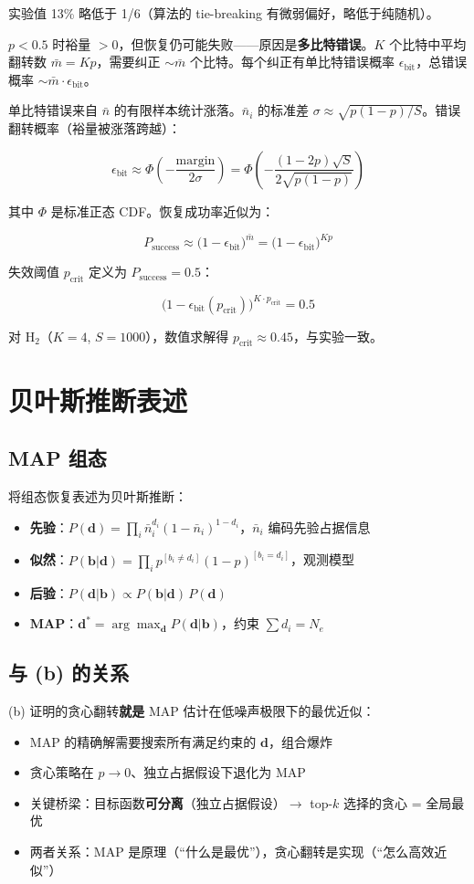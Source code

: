 \documentclass[11pt,a4paper]{article}
\begin{document}
实验值 13\% 略低于 1/6（算法的 tie-breaking 有微弱偏好，略低于纯随机）。

$p < 0.5$ 时裕量 $> 0$，但恢复仍可能失败——原因是\textbf{多比特错误}。$K$ 个比特中平均翻转数 $\bar{m} = Kp$，需要纠正 $\sim \bar{m}$ 个比特。每个纠正有单比特错误概率 $\epsilon_{\text{bit}}$，总错误概率 $\sim \bar{m} \cdot \epsilon_{\text{bit}}$。

单比特错误来自 $\bar{n}$ 的有限样本统计涨落。$\bar{n}_i$ 的标准差 $\sigma \approx \sqrt{p(1-p)/S}$。错误翻转概率（裕量被涨落跨越）：

$$\epsilon_{\text{bit}} \approx \Phi\!\left(-\frac{\text{margin}}{2\sigma}\right) = \Phi\!\left(-\frac{(1-2p)\sqrt{S}}{2\sqrt{p(1-p)}}\right)$$

其中 $\Phi$ 是标准正态 CDF。恢复成功率近似为：

$$P_{\text{success}} \approx \big(1 - \epsilon_{\text{bit}}\big)^{\bar{m}} = \big(1 - \epsilon_{\text{bit}}\big)^{Kp}$$

失效阈值 $p_{\text{crit}}$ 定义为 $P_{\text{success}} = 0.5$：

$$\big(1 - \epsilon_{\text{bit}}(p_{\text{crit}})\big)^{K \cdot p_{\text{crit}}} = 0.5$$

对 H$_2$（$K=4$, $S=1000$），数值求解得 $p_{\text{crit}} \approx 0.45$，与实验一致。


\section*{贝叶斯推断表述}

\subsection*{MAP 组态}

将组态恢复表述为贝叶斯推断：

\begin{itemize}
  \item \textbf{先验}：$P(\mathbf{d}) = \prod_i \bar{n}_i^{d_i}(1-\bar{n}_i)^{1-d_i}$，$\bar{n}_i$ 编码先验占据信息
  \item \textbf{似然}：$P(\mathbf{b}|\mathbf{d}) = \prod_i p^{[b_i \neq d_i]}(1-p)^{[b_i = d_i]}$，观测模型
  \item \textbf{后验}：$P(\mathbf{d}|\mathbf{b}) \propto P(\mathbf{b}|\mathbf{d})\,P(\mathbf{d})$
  \item \textbf{MAP}：$\mathbf{d}^* = \arg\max_{\mathbf{d}} P(\mathbf{d}|\mathbf{b})$，约束 $\sum d_i = N_e$
\end{itemize}

\subsection*{与 (b) 的关系}

(b) 证明的贪心翻转\textbf{就是} MAP 估计在低噪声极限下的最优近似：

\begin{itemize}
  \item MAP 的精确解需要搜索所有满足约束的 $\mathbf{d}$，组合爆炸
  \item 贪心策略在 $p \to 0$、独立占据假设下退化为 MAP
  \item 关键桥梁：目标函数\textbf{可分离}（独立占据假设）$\to$ top-$k$ 选择的贪心 = 全局最优
  \item 两者关系：MAP 是原理（``什么是最优''），贪心翻转是实现（``怎么高效近似''）
\end{itemize}
\end{document}
